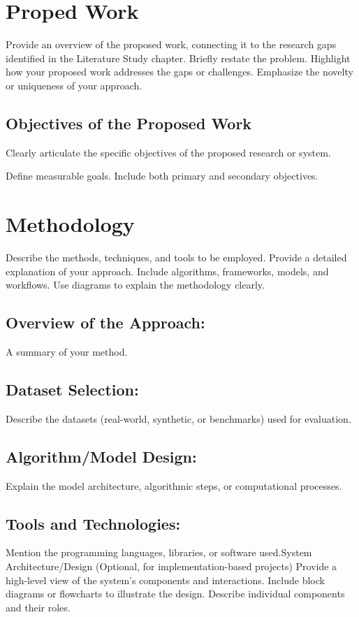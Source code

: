 \label{chap.3}
\section{Proped Work}
Provide an overview of the proposed work, connecting it to the research gaps identified in the Literature Study chapter.
Briefly restate the problem.
Highlight how your proposed work addresses the gaps or challenges.
Emphasize the novelty or uniqueness of your approach.

\subsection{ Objectives of the Proposed Work}
 Clearly articulate the specific objectives of the proposed research or system.

Define measurable goals.
Include both primary and secondary objectives.

\section{ Methodology}
 Describe the methods, techniques, and tools to be employed.
Provide a detailed explanation of your approach.
Include algorithms, frameworks, models, and workflows.
Use diagrams to explain the methodology clearly.

\subsection{Overview of the Approach:} A summary of your method.
\subsection{Dataset Selection:} Describe the datasets (real-world, synthetic, or benchmarks) used for evaluation.
\subsection{Algorithm/Model Design:} Explain the model architecture, algorithmic steps, or computational processes.
\subsection{Tools and Technologies:} Mention the programming languages, libraries, or software used.System Architecture/Design (Optional, for implementation-based projects)
Provide a high-level view of the system's components and interactions.
Include block diagrams or flowcharts to illustrate the design.
Describe individual components and their roles.
